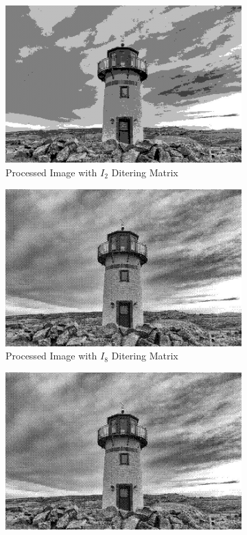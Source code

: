 \documentclass[12pt]{article}
\begin{document}
\begin{figure}[H]
	\centering  %
	\begin{subfigure}{0.32\textwidth}
		\centering
		\includegraphics[width=\textwidth]{LighthouseI_2.jpg}
		\caption{Processed Image with $I_2$ Ditering Matrix}
		\label{fig:LighthouseI_2}
	\end{subfigure}
	\hfill
	\begin{subfigure}{0.32\textwidth}
		\centering
		\includegraphics[width=\textwidth]{LighthouseI_8.jpg}
		\caption{Processed Image with $I_8$ Ditering Matrix}
		\label{fig:LighthouseI_8}
	\end{subfigure}
	\hfill
	\begin{subfigure}{0.32\textwidth}
		\centering
		\includegraphics[width=\textwidth]{LighthouseI_32.jpg}

\end{subfigure}
\end{figure}
\end{document}
